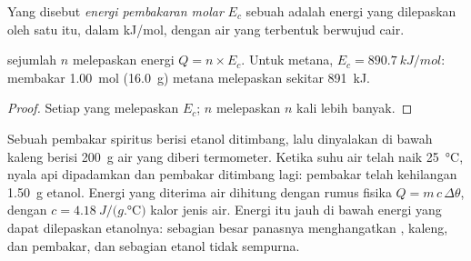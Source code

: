 \begin{definition}\label{def:g11:reaction-energy:combustion-energy}
Yang disebut \emph{energi pembakaran molar}
$E_c$ sebuah  adalah energi yang dilepaskan oleh  satu   itu, dalam \si{kJ/mol}, dengan air yang
terbentuk berwujud cair.
\end{definition}

\begin{proposition}\label{prop:g11:reaction-energy:n-moles}
  sejumlah $n$ melepaskan energi
$Q = n \times E_c$. Untuk metana, $E_c = \qty{890.7}{kJ/mol}$: membakar
\qty{1.00}{mol} (\qty{16.0}{g}) metana melepaskan sekitar \qty{891}{kJ}.
\end{proposition}

\begin{proof}
Setiap   yang  melepaskan $E_c$; $n$ 
melepaskan $n$ kali lebih banyak.
\end{proof}

\begin{inthelab}
Sebuah pembakar spiritus berisi etanol ditimbang, lalu dinyalakan di
bawah kaleng  berisi \qty{200}{g} air yang diberi termometer.
Ketika suhu air telah naik \qty{25}{\celsius}, nyala api dipadamkan dan
pembakar ditimbang lagi: pembakar telah kehilangan \qty{1.50}{g} etanol.
Energi yang diterima air dihitung dengan rumus fisika
$Q = m\, c\, \Delta\theta$, dengan $c = \qty{4.18}{J/(g.\celsius)}$
kalor jenis air. Energi itu jauh di bawah energi yang dapat dilepaskan
etanolnya: sebagian besar panasnya menghangatkan , kaleng, dan
pembakar, dan sebagian etanol  tidak sempurna.
\end{inthelab}


